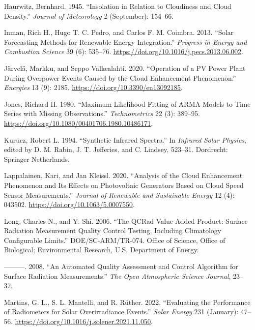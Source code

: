 \documentclass[
]{article}
\newlength{\cslhangindent}
\newlength{\cslentryspacingunit} %
\newenvironment{CSLReferences}[2] %
 {%
  \setlength{\parindent}{0pt}
  \ifodd #1
  \let\oldpar\par
  \def\par{\hangindent=\cslhangindent\oldpar}
  \fi
  \setlength{\parskip}{#2\cslentryspacingunit}
 }%
 {}
\begin{document}
\begin{CSLReferences}{1}{0}
\leavevmode{}%
Haurwitz, Bernhard. 1945. {``Insolation in {Relation} to {Cloudiness} and {Cloud} {Density}.''} \emph{Journal of Meteorology} 2 (September): 154--66.

\leavevmode{}%
Inman, Rich H., Hugo T. C. Pedro, and Carlos F. M. Coimbra. 2013. {``Solar Forecasting Methods for Renewable Energy Integration.''} \emph{Progress in Energy and Combustion Science} 39 (6): 535--76. \url{https://doi.org/10.1016/j.pecs.2013.06.002}.

\leavevmode{}%
Järvelä, Markku, and Seppo Valkealahti. 2020. {``Operation of a {PV} Power Plant During Overpower Events Caused by the Cloud Enhancement Phenomenon.''} \emph{Energies} 13 (9): 2185. \url{https://doi.org/10.3390/en13092185}.

\leavevmode{}%
Jones, Richard H. 1980. {``Maximum Likelihood Fitting of {ARMA} Models to Time Series with Missing Observations.''} \emph{Technometrics} 22 (3): 389--95. \url{https://doi.org/10.1080/00401706.1980.10486171}.

\leavevmode{}%
Kurucz, Robert L. 1994. {``Synthetic Infrared Spectra.''} In \emph{Infrared Solar Physics}, edited by D. M. Rabin, J. T. Jefferies, and C. Lindsey, 523--31. Dordrecht: Springer Netherlands.

\leavevmode{}%
Lappalainen, Kari, and Jan Kleissl. 2020. {``Analysis of the Cloud Enhancement Phenomenon and Its Effects on Photovoltaic Generators Based on Cloud Speed Sensor Measurements.''} \emph{Journal of Renewable and Sustainable Energy} 12 (4): 043502. \url{https://doi.org/10.1063/5.0007550}.

\leavevmode{}%
Long, Charles N., and Y. Shi. 2006. {``The QCRad Value Added Product: Surface Radiation Measurement Quality Control Testing, Including Climatology Configurable Limits.''} DOE/SC-ARM/TR-074. Office of Science, Office of Biological; Environmental Research, U.S. Department of Energy.

\leavevmode{}%
---------. 2008. {``An Automated Quality Assessment and Control Algorithm for Surface Radiation Measurements.''} \emph{The Open Atmospheric Science Journal}, 23--37.

\leavevmode{}%
Martins, G. L., S. L. Mantelli, and R. Rüther. 2022. {``Evaluating the Performance of Radiometers for Solar Overirradiance Events.''} \emph{Solar Energy} 231 (January): 47--56. \url{https://doi.org/10.1016/j.solener.2021.11.050}.


\end{CSLReferences}
\end{document}
